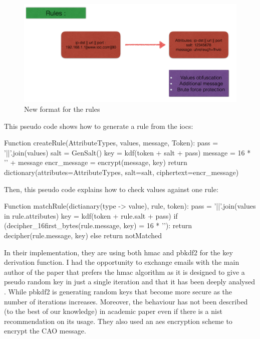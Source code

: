 \documentclass{eplmastersthesis}
\begin{document}
\begin{figure}[h!]
\begin{center}
	\includegraphics[scale=0.5]{res/obfuscation-rule}
	\caption{New format for the rules}
	\label{Obfuscation-Rule}
\end{center}
\end{figure}


This pseudo code shows how to generate a rule from the \gls{ioc}s:

\begin{center}
\begin{boxedverbatim}
Function createRule(AttributeTypes, values, message, Token):
        pass = '||'.join(values)
        salt = GenSalt()
        key = kdf(token + salt + pass)
        message = 16 * '' + message
        encr_message = encrypt(message, key)
        return dictionary(attributes=AttributeTypes, 
                            salt=salt,
                            ciphertext=encr_message)
\end{boxedverbatim}
\end{center}

Then, this pseudo code explains how to check values against one rule:
\begin{center}
\begin{boxedverbatim}
Function matchRule(dictianary(type -> value), rule, token):
        pass = '||'.join(values in rule.attributes)
        key = kdf(token + rule.salt + pass)
        if (decipher_16first_bytes(rule.message, key) = 16 * ''):
                return decipher(rule.message, key)
        else
                return notMatched
\end{boxedverbatim}
\end{center}


In their implementation, they are using both \gls{hmac} and \gls{pbkdf2} for the key derivation function. I had the opportunity to exchange emails with the main author of the paper that prefers the \gls{hmac} algorithm as it is designed to give a pseudo random key in just a single iteration and that it has been deeply analysed \cite{cryptoeprint}. While \gls{pbkdf2} is generating random keys that become more secure as the number of iterations increases. Moreover, the behaviour has not been described (to the best of our knowledge) in academic paper even if there is a \gls{nist} recommendation on its usage.
They also used an \gls{aes} encryption scheme to encrypt the CAO message.\\
\end{document}
